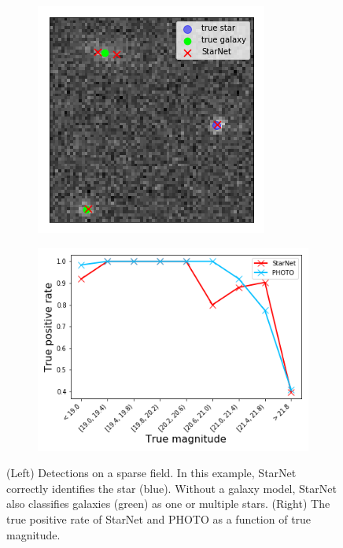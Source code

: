 \begin{figure}[tb]
    \centering
    \begin{subfigure}{0.45\textwidth}
        \includegraphics[width=\textwidth]{figures/sparse_field/sparse_field_detections.png}
    \end{subfigure}
    \begin{subfigure}{0.54\textwidth}
        \includegraphics[width=\textwidth]{figures/sparse_field/sparse_field_tpr.png}
    \end{subfigure}
    \caption{(Left) Detections on a sparse field. 
    In this example, StarNet correctly identifies the star (blue). 
    Without a galaxy model, StarNet also classifies galaxies (green) as one or multiple stars.
    (Right) The true positive rate of StarNet and PHOTO as a function of true magnitude.}
    \label{fig:sparse_field}
\end{figure}
